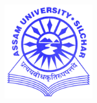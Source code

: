 \documentclass[10pt, oneside]{Thesis} %
\begin{document}
\begin{center}
    \includegraphics[width=4cm]{Logo.png} %
 

\end{center}
\end{document}
